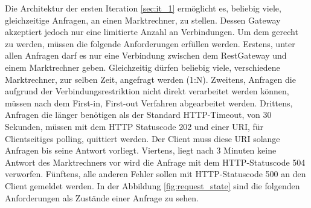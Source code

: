 \documentclass{article}
\begin{document}
Die Architektur der ersten Iteration \ref{sec:it_1} ermöglicht es, beliebig viele, gleichzeitige Anfragen, an einen Marktrechner, zu stellen. Dessen Gateway akzeptiert jedoch nur eine limitierte Anzahl an Verbindungen. Um dem gerecht zu werden, müssen die folgende Anforderungen erfüllen werden. Erstens, unter allen Anfragen darf es nur eine Verbindung zwischen dem RestGateway und einem Marktrechner geben. Gleichzeitig dürfen beliebig viele, verschiedene Marktrechner, zur selben Zeit, angefragt werden (1:N). Zweitens, Anfragen die aufgrund der Verbindungsrestriktion nicht direkt verarbeitet werden können, müssen nach dem First-in, First-out Verfahren abgearbeitet werden. Drittens, Anfragen die länger benötigen als der Standard HTTP-Timeout, von 30 Sekunden, müssen mit dem HTTP Statuscode 202 und einer URI, für Clientseitiges polling, quittiert werden. Der Client muss diese URI solange Anfragen bis seine Antwort vorliegt. Viertens, liegt nach 3 Minuten keine Antwort des Marktrechners vor wird die Anfrage mit dem HTTP-Statuscode 504 verworfen. Fünftens, alle anderen Fehler sollen mit HTTP-Statuscode 500 an den Client gemeldet werden. In der Abbildung \ref{fig:request_state} sind die folgenden Anforderungen als Zustände einer Anfrage zu sehen.

\end{document}
